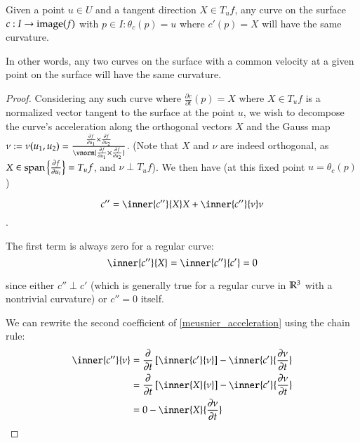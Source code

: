 		\begin{theorem}
			Given a point $u \in U $ and a tangent direction $X \in T_u f$,
		    any curve on the surface $c: I \to \mathrm{image}(f)$ with $p\in I : \theta_c(p) = u$
		    where $c'(p) = X$ will have the same curvature.
		\end{theorem}
		
		
		In other words, any two curves on the surface with a common velocity at a given point on the surface will have the same curvature.
		\begin{proof}
		Considering any such curve where $\frac{\partial c}{\partial t}(p) = X$ where $X \in T_u f$ is a normalized vector tangent to the surface at the point $u$,
		we wish to decompose the curve's acceleration along the  orthogonal vectors $X$ and
		the Gauss map $\nu := \nu(u_1, u_2) =
			\frac{\frac{\partial f}{\partial u_1} \times \frac{\partial f}{\partial u_2}}
			{\vnorm{\frac{\partial f}{\partial u_1} \times \frac{\partial f}{\partial u_2}}}$.
			(Note that $X$ and $\nu$ are indeed orthogonal,
			as $ X \in \mathrm{span}\left\{\frac{\partial f}{\partial u_i}\right\} = T_u f$, and
			$\nu \perp T_u f$).
			 We then have (at this fixed point $u=\theta_c(p)$)
			
			\begin{equation} \label{meusnier_acceleration}
				c'' = \inner{c''}{X} X + \inner{c''}{\nu}\nu
				\end{equation}. 
		
		The first term is always zero for a regular curve:
		\[ \inner{c''}{X} = \inner{c''}{c'} = 0 \]
		
		since either $c'' \perp c'$ (which is generally true for a regular curve in $\mathbb{R}^3$ with a nontrivial curvature) or $c'' = 0$ itself.  
		
		We can rewrite the second coefficient of \cref{meusnier_acceleration} using the chain rule: %
		\begin{align}
			\inner{c''}{\nu} &=
			\frac{\partial}{\partial t}\left[ \inner{c'}{\nu} \right]
				- \inner{c'}{\frac{\partial \nu}{\partial t}} \\
				&= \frac{\partial}{\partial t}\left[ \inner{X}{\nu} \right]
				- \inner{c'}{\frac{\partial \nu}{\partial t}} \\
				&= 0 - \inner{X}{\frac{\partial \nu}{\partial t}}
				\end{align}
		

\end{proof}
